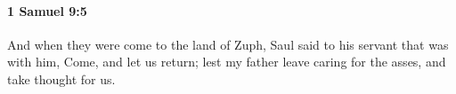 
		\paragraph{1 Samuel 9:5} %
			\label{1SAMUEL-9-5}

			And when they were come to the land of Zuph, Saul said to his servant that was with him, Come, and let us return; lest my father leave caring for the asses, and take thought for us.


